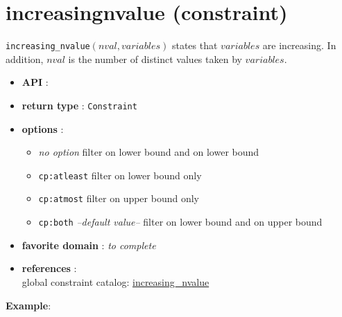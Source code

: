 \label{increasingnvalue}
\hypertarget{increasingnvalue}{}

\section{increasingnvalue (constraint)}\label{increasingnvalue:increasingnvalueconstraint}\hypertarget{increasingnvalue:increasingnvalueconstraint}{}
\begin{notedef}
  \texttt{increasing\_nvalue}$(nval, variables)$ states that $variables$ are increasing. In addition, $nval$ is the number of distinct values taken by $variables$.
\end{notedef}

\begin{itemize}
	\item \textbf{API} : 
	\item \textbf{return type} : \texttt{Constraint}
	\item \textbf{options} :
	\begin{itemize}
		\item \emph{no option} filter on lower bound and on lower bound
		\item \texttt{cp:atleast} filter on lower bound only
		\item \texttt{cp:atmost} filter on upper bound only
		\item \texttt{cp:both} \textit{--default value--} filter on lower bound and on upper bound
	\end{itemize}
	\item \textbf{favorite domain} : \emph{to complete}
	\item \textbf{references} :\\
      global constraint catalog: \href{http://www.emn.fr/x-info/sdemasse/gccat/Cincreasing_nvalue.html}{increasing\_nvalue}
\end{itemize}

\textbf{Example}:
 
